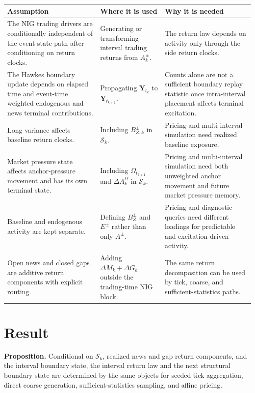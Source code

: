 \documentclass[11pt]{article}
\begin{document}
\begin{tabularx}{\textwidth}{XXX}
\toprule
Assumption & Where it is used & Why it is needed\\
\midrule
The NIG trading drivers are conditionally independent of the event-state path after conditioning on return clocks.
& Generating or transforming interval trading returns from \(A_k^\pm\).
& The return law depends on activity only through the side return clocks.\\
The Hawkes boundary update depends on elapsed time and event-time weighted
endogenous and news terminal contributions.
& Propagating \(\mathbf Y_{t_k}\) to \(\mathbf Y_{t_{k+1}}\).
& Counts alone are not a sufficient boundary replay statistic once intra-interval
placement affects terminal excitation.\\
Long variance affects baseline return clocks.
& Including \(B_{Z,k}^\pm\) in \(\mathcal S_k\).
& Pricing and multi-interval simulation need realized baseline exposure.\\
Market pressure state affects anchor-pressure movement and has its own terminal state.
& Including \(\Omega_{t_{k+1}}\) and \(\Delta A_k^\Omega\) in \(\mathcal S_k\).
& Pricing and multi-interval simulation need both unweighted anchor movement and future market pressure memory.\\
Baseline and endogenous activity are kept separate.
& Defining \(B_Z^\pm\) and \(E^\pm\) rather than only \(A^\pm\).
& Pricing and diagnostic queries need different loadings for predictable and excitation-driven activity.\\
Open news and closed gaps are additive return components with explicit routing.
& Adding \(\Delta M_k+\Delta G_k\) outside the trading-time NIG block.
& The same return decomposition can be used by tick, coarse, and sufficient-statistics paths.\\
\bottomrule
\end{tabularx}

\section{Result}

\noindent\textbf{Proposition.} Conditional on \(\mathcal S_k\), realized news
and gap return components, and the interval boundary state, the interval
return law and the next structural boundary state are determined by the same
objects for seeded tick aggregation, direct coarse generation,
sufficient-statistics sampling, and affine pricing.
\end{document}
